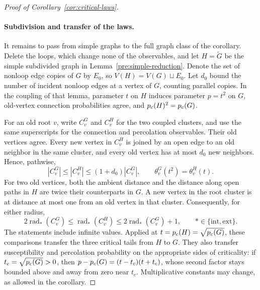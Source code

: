 \begin{proof}[Proof of Corollary~\ref{cor:critical-laws}]
\paragraph{Subdivision and transfer of the laws.}
It remains to pass from simple graphs to the full graph class of the
corollary. Delete the loops, which change none of the observables,
and let $H=\widetilde G$ be the simple subdivided graph in
Lemma~\ref{pre:simple-reduction}. Denote the set of nonloop edge copies of
$G$ by $E_0$, so $V(H)=V(G)\sqcup E_0$. Let $d_0$ bound the number
of incident nonloop edges at a vertex of $G$, counting parallel copies.
In the coupling of that lemma, parameter $t$ on $H$ induces parameter
$p=t^2$ on $G$, old-vertex connection probabilities agree, and
${p_c}(H)^2={p_c}(G)$.

For an old root $v$, write $C_v^G$ and $C_v^H$ for the two coupled
clusters, and use the same superscripts for the connection and
percolation observables. Their old vertices agree. Every new vertex
in $C_v^H$ is joined by an open edge to an old neighbor in the same
cluster, and every old vertex has at most $d_0$ new neighbors.
Hence, pathwise,
\begin{equation}\label{eq:subdivision-size}
 |C_v^G|\le |C_v^H|\le(1+d_0)|C_v^G|,
 \qquad
 \theta_v^G(t^2)=\theta_v^H(t).
\end{equation}
For two old vertices, both the ambient distance and the distance along
open paths in $H$ are twice their counterparts in $G$. A new vertex
in the root cluster is at distance at most one from an old vertex in
that cluster. Consequently, for either radius,
\begin{equation}\label{eq:subdivision-radius}
 2\operatorname{rad}_{*}(C_v^G)
 \le \operatorname{rad}_{*}(C_v^H)
 \le2\operatorname{rad}_{*}(C_v^G)+1,
 \qquad *\in\{\mathrm{int},\mathrm{ext}\}.
\end{equation}
The statements include infinite values. Applied at
$t={p_c}(H)=\sqrt{{p_c}(G)}$, these comparisons transfer the three
critical tails from $H$ to $G$. They also transfer susceptibility
and percolation probability on the appropriate sides of criticality:
if $t_c=\sqrt{{p_c}(G)}>0$, then
$p-{p_c}(G)=(t-t_c)(t+t_c)$, whose second factor stays bounded above
and away from zero near $t_c$. Multiplicative constants may change,
as allowed in the corollary.


\end{proof}
